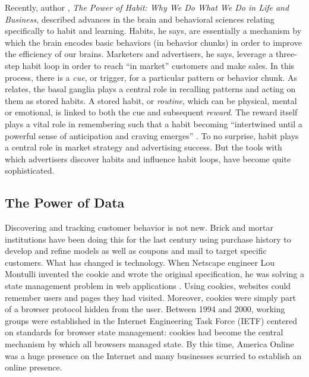 Recently, author  \cite{Duhigg:2012uk},  \emph{The Power of Habit: Why We Do What We Do in Life and Business}, described advances in the brain and behavioral sciences relating specifically to habit and learning. Habits, he says, are essentially a mechanism by which the brain encodes basic behaviors (in behavior chunks) in order to improve the efficiency of our brains. Marketers and advertisers, he says, leverage a three-step habit loop in order to reach ``in market'' customers and make sales. In this process, there is a \emph{cue}, or trigger, for a particular pattern or behavior chunk. As  \cite{Duhigg:2012uk}  relates, the basal ganglia plays a central role in recalling patterns and acting on them as stored habits. A stored habit, or \emph{routine}, which can be physical, mental or emotional, is linked to both the cue and subsequent \emph{reward}. The reward itself plays a vital role in remembering such that a habit becoming ``intertwined until a powerful sense of anticipation and craving emerges''  \citep[p. 19]{Duhigg:2012uk}.  To no surprise, habit plays a central role in market strategy and advertising success. But the tools with which advertisers discover habits and influence habit loops, have become quite sophisticated.

\subsection{The Power of Data}
\label{thepowerofdata}

Discovering and tracking customer behavior is not new. Brick and mortar institutions have been doing this for the last century using purchase history to develop and refine models as well as coupons and mail to target specific customers. What has changed is technology. When Netscape engineer Lou Montulli invented the cookie and wrote the original specification, he was solving a state management problem in web applications  \citep{Kristol:2001dg}.  Using cookies, websites could remember users and pages they had visited. Moreover, cookies were simply part of a browser protocol hidden from the user. Between 1994 and 2000, working groups were established in the Internet Engineering Task Force (IETF) centered on standards for browser state management: cookies had become the central mechanism by which all browsers managed state. By this time, America Online was a huge presence on the Internet and many businesses scurried to establish an online presence.

